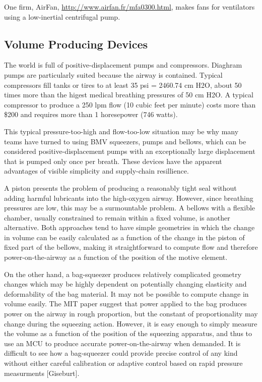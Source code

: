 \documentclass{article}
\begin{document}
One firm, AirFan, \url{http://www.airfan.fr/mfa0300.html}, makes fans for ventilators using a low-inertial centrifugal pump.

\subsection{Volume Producing Devices}

The world is full of positive-displacement pumps and compressors. Diaghram pumps are particularly suited because
the airway is contained. Typical compressors fill tanks or tires to at least 35 psi = 2460.74 cm H2O,
about 50 times more than the higest medical breathing pressures of 50 cm H2O. A typical compressor to produce a 250 lpm
flow (10 cubic feet per minute) costs more than \$200 and requires more than 1 horesepower (746 watts).

This typical pressure-too-high and flow-too-low situation may be why many teams have turned to using BMV squeezers, pumps and bellows,
which can be considered positive-displacement pumps with an exceptionally large displacement that is pumped only once per breath.
These devices have the apparent advantages of visible simplicity and supply-chain resillience.

A piston presents the problem of producing a reasonably tight seal without adding harmful lubricants into the high-oxygen airway.
However, since breathing pressures are low, this may be a surmountable problem. A bellows with a flexible chamber, usually constrained
to remain within a fixed volume, is another alternative.  Both approaches tend to have simple geometries in which the
change in volume can be easily calculated as a function of the change in the piston of fixed part of the bellows, making
it straightforward to compute flow and therefore power-on-the-airway as a function of the position of the motive element.

On the other hand, a bag-squeezer produces relatively complicated geometry changes which may be highly dependent on potentially
changing elasticity and deformability of the bag material. It may not be possible to compute change in volume easily.
The MIT paper suggest that power applied to the bag produces
power on the airway in rough proportion, but the constant of proportionality may change during the squeezing action.
However, it is easy enough to simply measure the volume as a function of the position of the squeezing apparatus, and thus to use
an MCU to produce accurate power-on-the-airway when demanded.
It is difficult to see how a bag-squeezer could provide precise control of any kind without either careful calibration
or adaptive control based on rapid pressure measurments [Giseburt].
\end{document}
